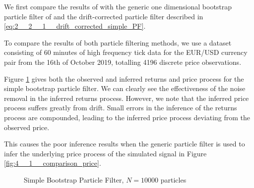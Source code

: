 \documentclass[../main.tex]{subfiles}
\begin{document}
We first compare the results of with the generic one dimensional bootstrap particle filter of  and the drift-corrected particle filter described in \autoref{eq:2__2__1__drift_corrected_simple_PF}. 

To compare the results of both particle filtering methods, we use a dataset consisting of 60 minutes of high frequency tick data for the EUR/USD currency pair from the 16th of October 2019, totalling 4196 discrete price observations. 

Figure \ref{fig:4__1__1__bootstrap_PF} gives both the observed and inferred returns and price process for the simple bootstrap particle filter. We can clearly see the effectiveness of the noise removal in the inferred returns process. However, we note that the inferred price process suffers greatly from drift. Small errors in the inference of the returns process are compounded, leading to the inferred price process deviating from the observed price. 

This causes the poor inference results when the generic particle filter is used to infer the underlying price process of the simulated signal in Figure \ref{fig:4__1__comparison_price}.

\begin{figure}[h!]
	\centering
	\qquad
	\caption{Simple Bootstrap Particle Filter, $N = 10000$ particles}
	\label{fig:4__1__1__bootstrap_PF}
\end{figure}
\end{document}
